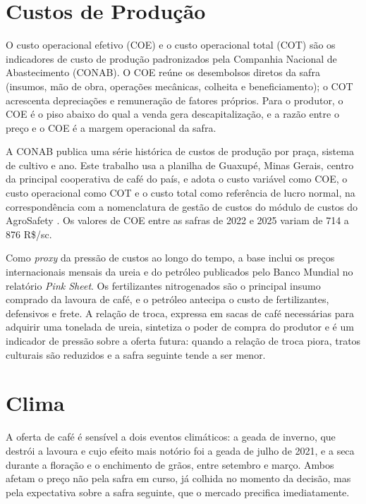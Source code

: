 \section{Custos de Produção}\label{sec2:fontes-custos}

O custo operacional efetivo (COE) e o custo operacional total (COT) são os indicadores de custo de produção padronizados pela Companhia Nacional de Abastecimento (CONAB). O COE reúne os desembolsos diretos da safra (insumos, mão de obra, operações mecânicas, colheita e beneficiamento); o COT acrescenta depreciações e remuneração de fatores próprios. Para o produtor, o COE é o piso abaixo do qual a venda gera descapitalização, e a razão entre o preço e o COE é a margem operacional da safra.

A CONAB publica uma série histórica de custos de produção por praça, sistema de cultivo e ano. Este trabalho usa a planilha de Guaxupé, Minas Gerais, centro da principal cooperativa de café do país, e adota o custo variável como COE, o custo operacional como COT e o custo total como referência de lucro normal, na correspondência com a nomenclatura de gestão de custos do módulo de custos do AgroSafety \cite{AgroSafety2026}. Os valores de COE entre as safras de 2022 e 2025 variam de 714 a 876 R\$/sc.

Como \textit{proxy} da pressão de custos ao longo do tempo, a base inclui os preços internacionais mensais da ureia e do petróleo publicados pelo Banco Mundial no relatório \textit{Pink Sheet}. Os fertilizantes nitrogenados são o principal insumo comprado da lavoura de café, e o petróleo antecipa o custo de fertilizantes, defensivos e frete. A relação de troca, expressa em sacas de café necessárias para adquirir uma tonelada de ureia, sintetiza o poder de compra do produtor e é um indicador de pressão sobre a oferta futura: quando a relação de troca piora, tratos culturais são reduzidos e a safra seguinte tende a ser menor.

\section{Clima}\label{sec2:fontes-clima}

A oferta de café é sensível a dois eventos climáticos: a geada de inverno, que destrói a lavoura e cujo efeito mais notório foi a geada de julho de 2021, e a seca durante a floração e o enchimento de grãos, entre setembro e março. Ambos afetam o preço não pela safra em curso, já colhida no momento da decisão, mas pela expectativa sobre a safra seguinte, que o mercado precifica imediatamente.

